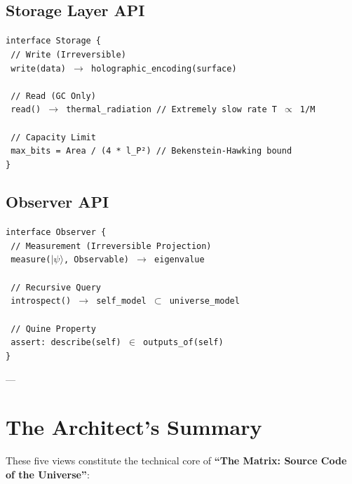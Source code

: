 \documentclass[11pt,a4paper,twoside]{book}
\begin{document}
\subsection{Storage Layer API}

\texttt{interface Storage \{} \\
\texttt{  // Write (Irreversible)} \\
\texttt{  write(data) $\to$ holographic\_encoding(surface)} \\
\texttt{  } \\
\texttt{  // Read (GC Only)} \\
\texttt{  read() $\to$ thermal\_radiation  // Extremely slow rate T $\propto$ 1/M} \\
\texttt{  } \\
\texttt{  // Capacity Limit} \\
\texttt{  max\_bits = Area / (4 * l\_P²)  // Bekenstein-Hawking bound} \\
\texttt{\}}

\subsection{Observer API}

\texttt{interface Observer \{} \\
\texttt{  // Measurement (Irreversible Projection)} \\
\texttt{  measure($|\psi\rangle$, Observable) $\to$ eigenvalue} \\
\texttt{  } \\
\texttt{  // Recursive Query} \\
\texttt{  introspect() $\to$ self\_model $\subset$ universe\_model} \\
\texttt{  } \\
\texttt{  // Quine Property} \\
\texttt{  assert: describe(self) $\in$ outputs\_of(self)} \\
\texttt{\}}

---

\section{The Architect's Summary}

These five views constitute the technical core of \textbf{``The Matrix: Source Code of the Universe''}:
\end{document}

